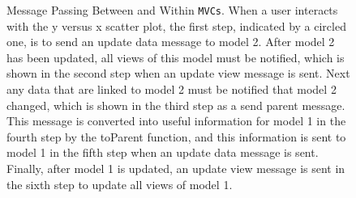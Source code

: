 \documentclass{article}[11pt]
\newcommand{\Rfunction}[1]{{\textsf{#1}}}
\newcommand{\Robject}[1]{{\texttt{#1}}}
\begin{document}
\begin{figure}[ht]
  \begin{center}
    \caption{ Message Passing Between and Within \Robject{MVCs}.  When a user
      interacts with the y versus x scatter plot, the first step, indicated by
      a circled one, is to send an update data message to model 2.  After
      model 2 has been updated, all views of this model must be notified, which
      is shown in the second step when an update view message is sent.  Next
      any data that are linked to model 2 must be notified that model 2
      changed, which is shown in the third step as a send parent message.
      This message is converted into useful information for model 1 in
      the fourth step by the \Rfunction{toParent} function, and this
      information is sent to model 1 in the fifth step when an update data
      message is sent.  Finally, after model 1 is updated, an update view
      message is sent in the sixth step to update all views of model 1. }
    \label{Fig:MessPass}
  \end{center}
\end{figure}
\end{document}
